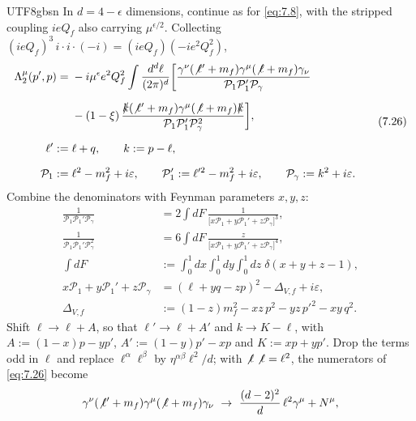 \documentclass[11pt,a4paper,oneside]{report}
\begin{document}
\begin{CJK*}{UTF8}{gbsn}
In $d=4-\epsilon$ dimensions, continue as for \eqref{eq:7.8}, with the stripped coupling $ieQ_f$ also carrying $\mu^{\epsilon/2}$. Collecting $(ieQ_f)^3\,i\cdot i\cdot(-i)=(ieQ_f)(-ie^2Q_f^2)$,
\begin{equation*}
\begin{aligned}
\Lambda_2^\mu(p',p)
={}&-i\mu^{\epsilon}e^2Q_f^2\int\frac{d^d\ell}{(2\pi)^d}\biggl[
\frac{\gamma^\nu(\not\ell'+m_f)\gamma^\mu(\not\ell+m_f)\gamma_\nu}{\mathcal P_1\mathcal P_1'\mathcal P_\gamma}\\[6pt]
&-(1-\xi)\,\frac{\slashed{k}(\not\ell'+m_f)\gamma^\mu(\not\ell+m_f)\slashed{k}}{\mathcal P_1\mathcal P_1'\mathcal P_\gamma^2}\biggr],\\[6pt]
\ell':={}&\ell+q,\qquad k:=p-\ell,\\[6pt]
\mathcal P_1:={}&\ell^2-m_f^2+i\varepsilon,\qquad
\mathcal P_1':=\ell'^2-m_f^2+i\varepsilon,\qquad
\mathcal P_\gamma:=k^2+i\varepsilon .
\end{aligned}
\tag{7.26}\label{eq:7.26}
\end{equation*}
Combine the denominators with Feynman parameters $x,y,z$:
\begin{equation*}
\begin{aligned}
\frac{1}{\mathcal P_1\mathcal P_1'\mathcal P_\gamma}
&=2\int dF\,\frac{1}{\bigl[x\mathcal P_1+y\mathcal P_1'+z\mathcal P_\gamma\bigr]^3},\\[6pt]
\frac{1}{\mathcal P_1\mathcal P_1'\mathcal P_\gamma^2}
&=6\int dF\,\frac{z}{\bigl[x\mathcal P_1+y\mathcal P_1'+z\mathcal P_\gamma\bigr]^4},\\[6pt]
\int dF&:=\int_0^1dx\int_0^1dy\int_0^1dz\;\delta(x+y+z-1),\\[6pt]
x\mathcal P_1+y\mathcal P_1'+z\mathcal P_\gamma
&=(\ell+yq-zp)^2-\Delta_{V,f}+i\varepsilon,\\[6pt]
\Delta_{V,f}&:=(1-z)m_f^2-xz\,p^2-yz\,p'^2-xy\,q^2 .
\end{aligned}
\tag{7.27}\label{eq:7.27}
\end{equation*}
Shift $\ell\to\ell+A$, so that $\ell'\to\ell+A'$ and $k\to K-\ell$, with $A:=(1-x)p-yp'$, $A':=(1-y)p'-xp$ and $K:=xp+yp'$. Drop the terms odd in $\ell$ and replace $\ell^\alpha\ell^\beta$ by $\eta^{\alpha\beta}\ell^2/d$; with $\not\ell\not\ell=\ell^2$, the numerators of \eqref{eq:7.26} become
\begin{equation*}
\begin{aligned}
\gamma^\nu(\not\ell'+m_f)\gamma^\mu(\not\ell+m_f)\gamma_\nu\ &\to\ \frac{(d-2)^2}{d}\,\ell^2\gamma^\mu+N^\mu,\\[4pt]

\end{aligned}
\end{equation*}
\end{CJK*}
\end{document}

